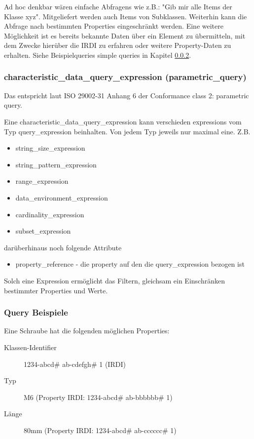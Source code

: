 Ad hoc denkbar wären einfache Abfragens wie z.B.: "Gib mir alle Items der Klasse xyz". Mitgeliefert werden auch Items von Subklassen. Weiterhin kann die Abfrage nach bestimmten Properties eingeschränkt werden. Eine weitere Möglichkeit ist es bereits bekannte Daten über ein Element zu übermitteln, mit dem Zwecke hierüber die IRDI zu erfahren oder weitere Property-Daten zu erhalten. Siehe Beispielqueries simple queries in Kapitel \ref{kap:query_beispiele}. 

\subsubsection{characteristic\_data\_query\_expression (parametric\_query)}
Das entspricht laut ISO 29002-31 Anhang 6 der Conformance class 2: parametric query.

Eine characteristic\_data\_query\_expression kann verschieden expressions vom Typ query\_expression beinhalten. Von jedem Typ jeweils nur maximal eine. 
Z.B.
\begin{itemize}
\item string\_size\_expression
\item string\_pattern\_expression
\item range\_expression
\item data\_environment\_expression
\item cardinality\_expression
\item subset\_expression
\end{itemize}
darüberhinaus noch folgende Attribute

\begin{itemize}
\item property\_reference - die property auf den die query\_expression bezogen ist
\end{itemize}
Solch eine Expression ermöglicht das Filtern, gleichsam ein Einschränken bestimmter Properties und Werte. 

\subsubsection{Query Beispiele}\label{kap:query_beispiele}

Eine Schraube hat die folgenden möglichen Properties: 

\begin{description}
\item[Klassen-Identifier] 1234-abcd\# ab-cdefgh\# 1 (IRDI)
\item[Typ] M6 (Property IRDI: 1234-abcd\# ab-bbbbbb\# 1)
\item[Länge] 80mm (Property IRDI: 1234-abcd\# ab-cccccc\# 1)
\end{description}

